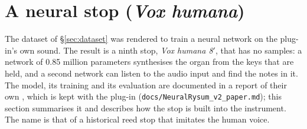 \documentclass[11pt,a4paper,parskip=half,DIV=11,toc=bibliography]{scrartcl}
\newcommand{\ui}[1]{\emph{#1}}                 %
\newcommand{\fn}[1]{\mbox{\texttt{#1}}}
\begin{document}
\section{A neural stop (\ui{Vox humana})}
\label{sec:vox}

The dataset of \S\ref{sec:dataset} was rendered to train a neural network on the plug-in's own sound. The result is a ninth stop,
\ui{Vox humana 8$'$}, that has no samples: a network of 0.85 million parameters synthesises the organ from the keys that are held, and a second network
can listen to the audio input and find the notes in it. The model, its training and its evaluation are documented in a report of their own
\citep{neuralrysum2}, which is kept with the plug-in (\fn{docs/NeuralRysum\_v2\_paper.md}); this section summarises it and describes how the stop is
built into the instrument. The name is that of a historical reed stop that imitates the human voice.
\end{document}
